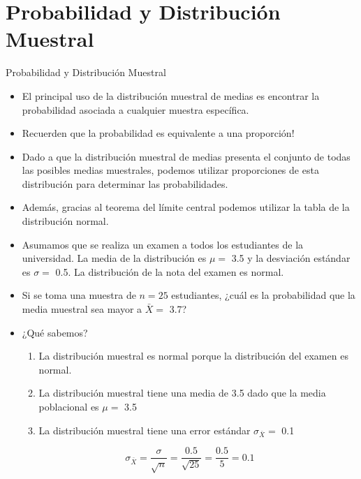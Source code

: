 \documentclass{beamer}
\begin{document}
\section{Probabilidad y Distribución Muestral}
\begin{frame}{Probabilidad y Distribución Muestral}
\begin{itemize}
\justifying
\item El principal uso de la distribución muestral de medias es encontrar la probabilidad asociada a cualquier muestra específica.
\item Recuerden que la probabilidad es equivalente a una proporción!
\item Dado a que la distribución muestral de medias presenta el conjunto de todas las posibles medias muestrales, podemos utilizar proporciones de esta distribución para determinar las probabilidades.
\item Además, gracias al teorema del límite central podemos utilizar la tabla de la distribución normal.
\end{itemize}
\end{frame}

\begin{frame}
\begin{itemize}
	\justifying
\item Asumamos que se realiza un examen a todos los estudiantes de la universidad. La media de la distribución es $\mu=$ 3.5 y la desviación estándar es $\sigma=$ 0.5. La distribución de la nota del examen es normal.
\item Si se toma una muestra de $n=25$ estudiantes, ¿cuál es la probabilidad que la media muestral sea mayor a $\bar{X}=$ 3.7?
\item ¿Qué sabemos?
\begin{enumerate}
\item La distribución muestral es normal porque la distribución del examen es normal.
\item La distribución muestral tiene una media de 3.5 dado que la media poblacional es $\mu=$ 3.5
\item La distribución muestral tiene una error estándar $\sigma_{\bar{X}}=$ 0.1
\end{enumerate}
$$\sigma_{\bar{X}}=\dfrac{\sigma}{\sqrt{n}}=\dfrac{0.5}{\sqrt{25}}=\dfrac{0.5}{5}=0.1$$
\end{itemize}
\end{frame}
\end{document}
